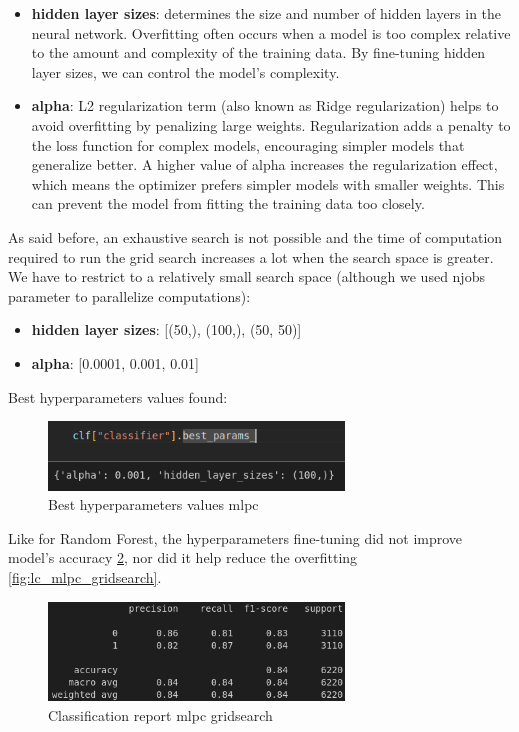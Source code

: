 \documentclass[a4paper,12pt]{article}
\begin{document}
\begin{itemize}
    \item \textbf{hidden layer sizes}: determines the size and number of hidden layers in the neural network. Overfitting often occurs when a model is too complex relative to the amount and complexity of the training data. By fine-tuning hidden layer sizes, we can control the model's complexity.
    \item \textbf{alpha}: L2 regularization term (also known as Ridge regularization) helps to avoid overfitting by penalizing large weights. Regularization adds a penalty to the loss function for complex models, encouraging simpler models that generalize better. A higher value of alpha increases the regularization effect, which means the optimizer prefers simpler models with smaller weights. This can prevent the model from fitting the training data too closely.
\end{itemize}


As said before, an exhaustive search is not possible and the time of computation required to run the grid search increases a lot when the search space is greater. We have to restrict to a relatively small search space (although we used njobs parameter to parallelize computations):
\begin{itemize}
    \item \textbf{hidden layer sizes}: [(50,), (100,), (50, 50)]
    \item \textbf{alpha}: [0.0001, 0.001, 0.01]
\end{itemize}

Best hyperparameters values found:

\begin{figure}[H]
  \centering
  \includegraphics[width=0.7\textwidth]{./images/best_params_mlpc.png}
  \caption{Best hyperparameters values mlpc}
  \label{fig:best_params_mlpc}
\end{figure}

Like for Random Forest, the hyperparameters fine-tuning did not improve model’s accuracy \ref{fig:report_mlpc_gridsearch}, nor did it help reduce the overfitting \ref{fig:lc_mlpc_gridsearch}.

\begin{figure}[H]
  \centering
  \includegraphics[width=0.7\textwidth]{./images/report_mlpc_gridsearch.png}
  \caption{Classification report mlpc gridsearch}
  \label{fig:report_mlpc_gridsearch}
\end{figure}
\end{document}
